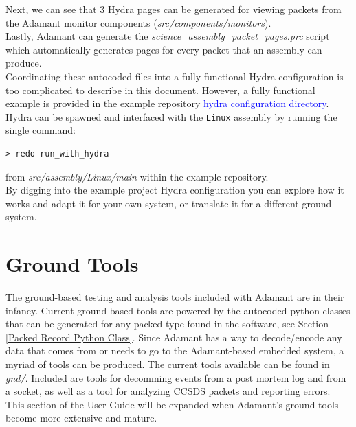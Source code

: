 Next, we can see that 3 Hydra pages can be generated for viewing packets from the Adamant monitor components (\textit{src/components/monitors}). \\

Lastly, Adamant can generate the \textit{science\_assembly\_packet\_pages.prc} script which automatically generates pages for every packet that an assembly can produce. \\

Coordinating these autocoded files into a fully functional Hydra configuration is too complicated to describe in this document. However, a fully functional example is provided in the example repository \href{https://github.com/lasp/adamant_example/tree/main/src/assembly/linux/main/hydra}{\textcolor{blue}{hydra configuration directory}}. Hydra can be spawned and interfaced with the \texttt{Linux} assembly by running the single command:

\vspace{5mm} %
\begin{verbatim}
> redo run_with_hydra
\end{verbatim}
\vspace{5mm} %

from \textit{src/assembly/Linux/main} within the example repository. \\

By digging into the example project Hydra configuration you can explore how it works and adapt it for your own system, or translate it for a different ground system.

\newpage
\section{Ground Tools} \label{Ground Tools}

The ground-based testing and analysis tools included with Adamant are in their infancy. Current ground-based tools are powered by the autocoded python classes that can be generated for any packed type found in the software, see Section \ref{Packed Record Python Class}. Since Adamant has a way to decode/encode any data that comes from or needs to go to the Adamant-based embedded system, a myriad of tools can be produced. The current tools available can be found in \textit{gnd/}. Included are tools for decomming events from a post mortem log and from a socket, as well as a tool for analyzing CCSDS packets and reporting errors. This section of the User Guide will be expanded when Adamant's ground tools become more extensive and mature.

